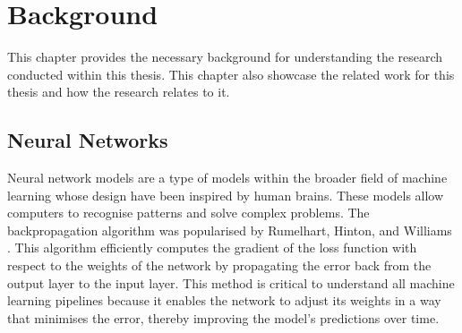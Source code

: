 ﻿\chapter{Background}
\label{ch:background}




This chapter provides the necessary background for understanding the research conducted within this thesis. This chapter also showcase the related work for this thesis and how the research relates to it.




\section{Neural Networks}


Neural network models are a type of models within the broader field of machine learning whose design have been inspired by human brains. These models allow computers to recognise patterns and solve complex problems. The backpropagation algorithm was popularised by Rumelhart, Hinton, and Williams \cite{rumelhart_learning_1986}. This algorithm efficiently computes the gradient of the loss function with respect to the weights of the network by propagating the error back from the output layer to the input layer. This method is critical to understand all machine learning pipelines because it enables the network to adjust its weights in a way that minimises the error, thereby improving the model's predictions over time.


